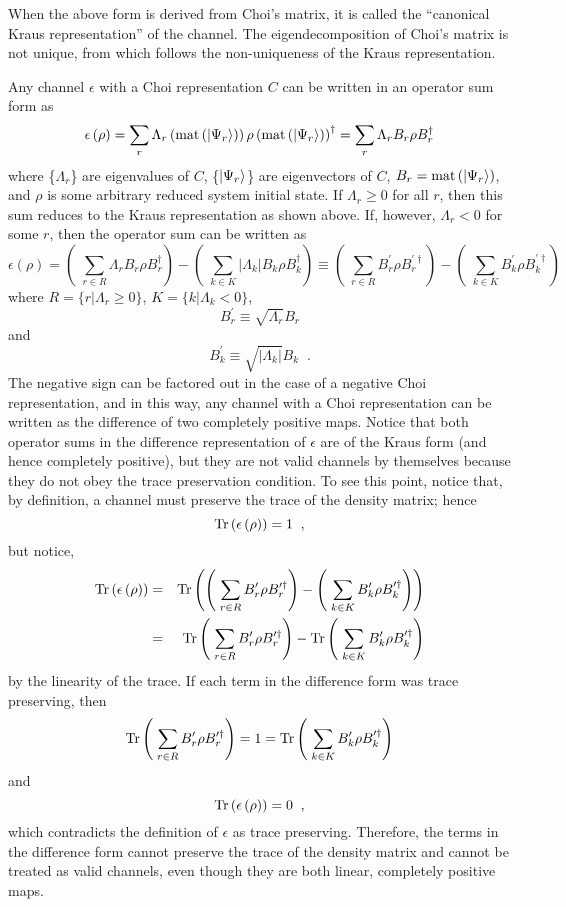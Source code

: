 When the above form is derived from Choi's matrix, it is called the ``canonical Kraus representation'' of the channel.  The eigendecomposition of Choi's matrix is not unique, from which follows the non-uniqueness of the Kraus representation.  

Any channel $\epsilon$ with a Choi representation $C$ can be written in an operator sum form as
$$
\epsilon\left(\rho\right) = \sum_r \Lambda_r \left(\operatorname{mat}\left(\left|\Psi_r\right\rangle\right)\right)\rho\left(\operatorname{mat}\left(\left|\Psi_r\right\rangle\right)\right)^\dagger = \sum_r \Lambda_r B_r \rho B_r^\dagger
$$
where \{$\Lambda_r$\} are eigenvalues of $C$, \{$\left|\Psi_r\right\rangle$\} are eigenvectors of $C$, $B_r = \operatorname{mat}\left(\left|\Psi_r\right\rangle\right)$, and $\rho$ is some arbitrary reduced system initial state.  If $\Lambda_r\ge 0$ for all $r$, then this sum reduces to the Kraus representation as shown above.  If, however, $\Lambda_r<0$ for some $r$, then the operator sum can be written as
$$
\epsilon\left(\rho\right) = \left(\;\sum_{r\in R} \Lambda_r B_r \rho B_r^\dagger\right) - \left(\;\sum_{k\in K} |\Lambda_k| B_k \rho B_k^\dagger\right) \equiv \left(\;\sum_{r\in R} B_r^\prime \rho B_r^{\prime\dagger}\right) - \left(\;\sum_{k\in K} B_k^\prime \rho B_k^{\prime\dagger}\right) 
$$
where $R = \{r|\Lambda_r\ge 0\}$, $K = \{k|\Lambda_k < 0\}$,
$$
B_r^\prime \equiv \sqrt{\Lambda_r} B_r
$$
and
$$
B_k^\prime \equiv \sqrt{|\Lambda_k|} B_k\;\;.
$$
The negative sign can be factored out in the case of a negative Choi representation, and in this way, any channel with a Choi representation can be written as the difference of two completely positive maps.  Notice that both operator sums in the difference representation of $\epsilon$ are of the Kraus form (and hence completely positive), but they are not valid channels by themselves because they do not obey the trace preservation condition.  To see this point, notice that, by definition, a channel must preserve the trace of the density matrix; hence
$$
\operatorname{Tr}\left(\epsilon\left(\rho\right)\right) = 1\;\;,
$$
but notice,
\begin{eqnarray*}
\operatorname{Tr}\left(\epsilon\left(\rho\right)\right) &=& \operatorname{Tr}\left(\left(\;\sum_{r\in R} B_r^\prime \rho B_r^{\prime\dagger}\right) - \left(\;\sum_{k\in K} B_k^\prime \rho B_k^{\prime\dagger}\right)\right)\\
&=&\operatorname{Tr}\left(\;\sum_{r\in R} B_r^\prime \rho B_r^{\prime\dagger}\right) - \operatorname{Tr}\left(\;\sum_{k\in K} B_k^\prime \rho B_k^{\prime\dagger}\right)
\end{eqnarray*}
by the linearity of the trace.  If each term in the difference form was trace preserving, then
$$
\operatorname{Tr}\left(\;\sum_{r\in R} B_r^\prime \rho B_r^{\prime\dagger}\right) = 1 = \operatorname{Tr}\left(\;\sum_{k\in K} B_k^\prime \rho B_k^{\prime\dagger}\right)
$$
and
$$
\operatorname{Tr}\left(\epsilon\left(\rho\right)\right) = 0\;\;,
$$
which contradicts the definition of $\epsilon$ as trace preserving.  Therefore, the terms in the difference form cannot preserve the trace of the density matrix and cannot be treated as valid channels, even though they are both linear, completely positive maps.

